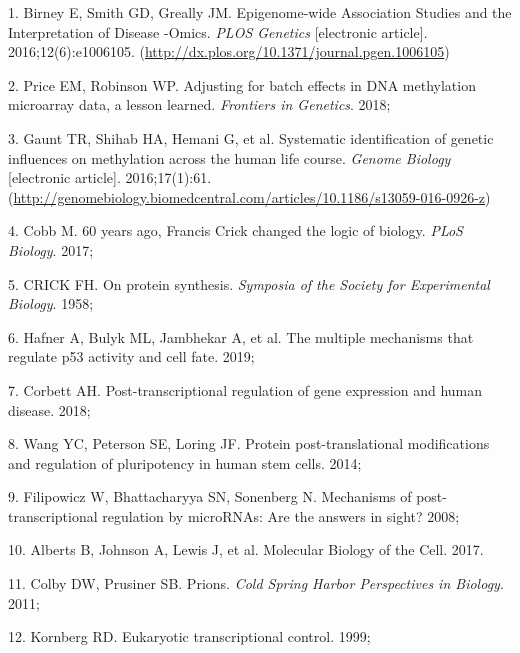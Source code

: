 \documentclass[11pt,oneside]{bristolthesis}
\newenvironment{cslreferences}%
  {}%
  {\par}
\begin{document}
\hypertarget{refs}{}
\begin{cslreferences}
\leavevmode\hypertarget{ref-Birney2016}{}%
1. Birney E, Smith GD, Greally JM. Epigenome-wide Association Studies and the Interpretation of Disease -Omics. \emph{PLOS Genetics} {[}electronic article{]}. 2016;12(6):e1006105. (\url{http://dx.plos.org/10.1371/journal.pgen.1006105})

\leavevmode\hypertarget{ref-Price2018}{}%
2. Price EM, Robinson WP. Adjusting for batch effects in DNA methylation microarray data, a lesson learned. \emph{Frontiers in Genetics}. 2018;

\leavevmode\hypertarget{ref-Gaunt2016}{}%
3. Gaunt TR, Shihab HA, Hemani G, et al. Systematic identification of genetic influences on methylation across the human life course. \emph{Genome Biology} {[}electronic article{]}. 2016;17(1):61. (\url{http://genomebiology.biomedcentral.com/articles/10.1186/s13059-016-0926-z})

\leavevmode\hypertarget{ref-Cobb2017}{}%
4. Cobb M. 60 years ago, Francis Crick changed the logic of biology. \emph{PLoS Biology}. 2017;

\leavevmode\hypertarget{ref-CRICK1958}{}%
5. CRICK FH. On protein synthesis. \emph{Symposia of the Society for Experimental Biology}. 1958;

\leavevmode\hypertarget{ref-Hafner2019}{}%
6. Hafner A, Bulyk ML, Jambhekar A, et al. The multiple mechanisms that regulate p53 activity and cell fate. 2019;

\leavevmode\hypertarget{ref-Corbett2018}{}%
7. Corbett AH. Post-transcriptional regulation of gene expression and human disease. 2018;

\leavevmode\hypertarget{ref-Wang2014}{}%
8. Wang YC, Peterson SE, Loring JF. Protein post-translational modifications and regulation of pluripotency in human stem cells. 2014;

\leavevmode\hypertarget{ref-Filipowicz2008}{}%
9. Filipowicz W, Bhattacharyya SN, Sonenberg N. Mechanisms of post-transcriptional regulation by microRNAs: Are the answers in sight? 2008;

\leavevmode\hypertarget{ref-Alberts2017}{}%
10. Alberts B, Johnson A, Lewis J, et al. Molecular Biology of the Cell. 2017.

\leavevmode\hypertarget{ref-Colby2011}{}%
11. Colby DW, Prusiner SB. Prions. \emph{Cold Spring Harbor Perspectives in Biology}. 2011;

\leavevmode\hypertarget{ref-Kornberg1999}{}%
12. Kornberg RD. Eukaryotic transcriptional control. 1999;


\end{cslreferences}
\end{document}
